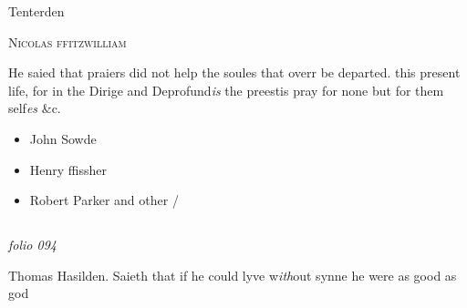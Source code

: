 \documentclass[12pt, a4paper]{book}
\begin{document}
		\ifthenelse{\isodd{\thepage}}
		{\reversemarginpar}
		{\normalmarginpar}
		 Tenterden
 
 

            
               
				\begin{center} \begin{large} {\scshape Nicolas ffitzwilliam} \end{large} \end{center}
			
            	
            		
			
            		
		\ifthenelse{\isodd{\thepage}}
		{\reversemarginpar}
		{\normalmarginpar}
		He saied that praiers did not help the soules that overr 
 be departed. this present life, for in the Dirige
  and Deprofund\textit{is} the preestis pray for none but
 for them self\textit{es} \&c.

	\begin{itemize}
		\item[]John Sowde
		\item[]Henry ffissher
		\item[]Robert Parker and other /
	\end{itemize}



            
\dotfill
					  \subsection*{}  \subsection*{}  \subsection*{}

\textit{folio 094}


 	
		\ifthenelse{\isodd{\thepage}}
		{\reversemarginpar}
		{\normalmarginpar}
		Thomas Hasilden. Saieth that if he could
 lyve w\textit{ith}out synne he were as good as god
\end{document}
